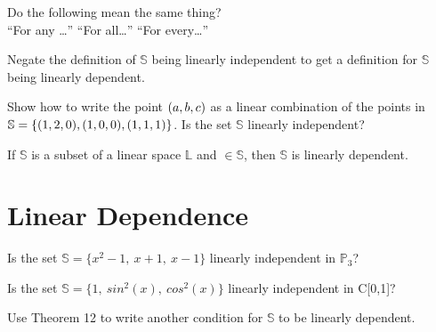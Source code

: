 \noindent {} Do the following mean the same thing?\\
\indent ``For any \ldots'' \quad  ``For all\ldots'' \quad ``For every\ldots''

\begin{myexb}[\bd{b}]
	Negate the definition of $\mathbb{S}$ being linearly independent to get a definition for $\mathbb{S}$ being linearly dependent.
\end{myexb}

\begin{myexc}[\bd{c}]
	Show how to write the point $({a},{b},{c})$ as a linear combination of the points in $\mathbb{S} = \{  ({1},{2},{0}), ({1},{0},{0}), ({1},{1},{1})  \}$. Is the set  $\mathbb{S}$ linearly independent?
\end{myexc}

\begin{theorem} 
	If $\mathbb{S}$ is a subset of a linear space $\mathbb{L}$ and  $\in \mathbb{S}$, then $\mathbb{S}$ is linearly dependent.
\end{theorem}
\vspace{-.3in}\hspace{5in}\begin{annotation}
\end{annotation}

\section{Linear Dependence}    \label{Linear Dependence}

\begin{myexa}[\bd{a}]
	Is the set $\mathbb{S} = \{x^2-1,\  x+1,\  x-1 \} $  linearly independent in $\mathbb{P}_3$?
\end{myexa}

\begin{myexb}[\bd{b}]
	Is the set $\mathbb{S} = \{1,\  sin^2(x),\  cos^2(x) \} $ linearly independent in C[0,1]?
\end{myexb}

\begin{myexc}[\bd{c}]
	Use Theorem 12 to write another condition for $\mathbb{S}$ to be linearly dependent. 
\end{myexc}


